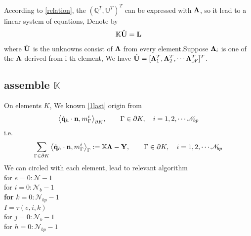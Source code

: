 \documentclass[10pt,reqno, final]{amsart}
\begin{document}
According to \eqref{relation}, the $(\mathbb Q^T, \mathbb U^T)^T$  can be expressed with $\bf\Lambda$, so it lead to a linear system of equations, Denote by
\begin{equation*}
  \mathbb{K}\hat{\bf{U}}  = \bf{L}
\end{equation*}
where $\hat{\bf{U}}$ is the unknowns consist of $\bf\Lambda$ from every element.Suppose ${\bf \Lambda}_{i}$ is one of the $\bf\Lambda$ derived from i-th element, We have
$\hat{\bf{U}} = [{\bf \Lambda}_{1}^T,{\bf \Lambda}_{2}^T,\cdots {\bf \Lambda}_{\mathscr N}^T]^T$.

\subsection{assemble $\mathbb{K}$}
On elements $K$, We known \eqref{1last} origin from
\begin{equation*}
  \big\langle\hat{\bf q}_h\cdot{\bf n}, m_{\Gamma}^i\big\rangle_{\partial K}, \qquad \Gamma \in \partial K
  ,\quad i = 1,2,\cdots \mathscr N_{bp}
\end{equation*}
i.e.
\begin{equation*}
  \sum_{\Gamma \in \partial K} \big\langle\hat{\bf q}_h\cdot{\bf n}, m_{\Gamma}^i\big\rangle_{\Gamma}
  := \mathbb{X}{\bf\Lambda} - {\bf Y} , \qquad \Gamma \in \partial K
  ,\quad i = 1,2,\cdots \mathscr N_{bp}
\end{equation*}
We can circled with each element, lead to relevant algorithm\\
for $e=0:\mathscr N-1 $ \\%
    \hspace*{20pt}for $i=0:\mathscr N_b-1 $  \\%
        \hspace*{40pt}\textbf{for} $k=0:\mathscr N_{bp}-1 $ \\%
            \hspace*{60pt}$I = \tau(e, i, k)$  \\%
            \hspace*{60pt}for $j=0:\mathscr N_b-1 $  \\%
                \hspace*{80pt}for $h=0:\mathscr N_{bp}-1 $ \\%
\end{document}
